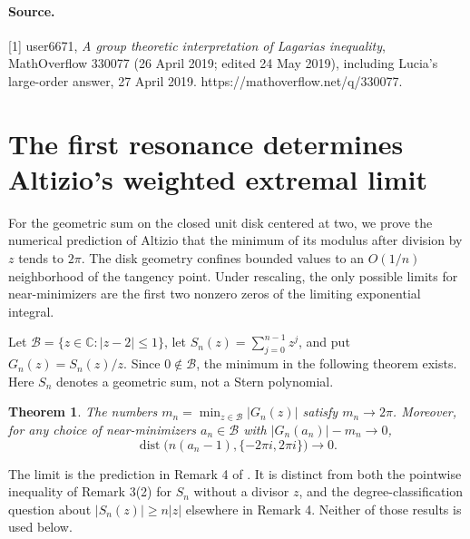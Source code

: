 \documentclass[11pt,a4paper]{article}
\numberwithin{equation}{section}
\newtheorem{theorem}{Theorem}[section]
\theoremstyle{definition}
\theoremstyle{remark}
\newenvironment{sectionabstract}{\par\smallskip\begingroup\small\noindent}{\par\endgroup\medskip}
\begin{document}
\paragraph{Source.} [1] user6671, \emph{A group theoretic interpretation of Lagarias inequality}, MathOverflow 330077 (26 April 2019; edited 24 May 2019), including Lucia's large-order answer, 27 April 2019. https://mathoverflow.net/q/330077.

\par\endgroup

\begingroup
\newcommand{\B}{\mathcal B}
\section{\texorpdfstring{The first resonance determines Altizio's weighted extremal limit}{The first resonance determines Altizio's weighted extremal limit}}\label{section:r50reiwa}
\par\medskip


\begin{sectionabstract}
For the geometric sum on the closed unit disk centered at two, we prove the numerical prediction of Altizio that the minimum of its modulus after division by \(z\) tends to \(2\pi\). The disk geometry confines bounded values to an \(O(1/n)\) neighborhood of the tangency point. Under rescaling, the only possible limits for near-minimizers are the first two nonzero zeros of the limiting exponential integral.
\end{sectionabstract}

Let \(\B=\{z\in\mathbb C:|z-2|\le1\}\), let \(S_n(z)=\sum_{j=0}^{n-1}z^j\), and put \(G_n(z)=S_n(z)/z\). Since \(0\notin\B\), the minimum in the following theorem exists. Here \(S_n\) denotes a geometric sum, not a Stern polynomial.
\begin{theorem}\label{r50reiwa:main}
The numbers \(m_n=\min_{z\in\B}|G_n(z)|\) satisfy \(m_n\to2\pi\). Moreover, for any choice of near-minimizers \(a_n\in\B\) with \(|G_n(a_n)|-m_n\to0\),
\[
 \operatorname{dist}\bigl(n(a_n-1),\{-2\pi i,2\pi i\}\bigr)\longrightarrow0.
\]
\end{theorem}
The limit is the prediction in Remark 4 of \cite{r50reiwa:A}. It is distinct from both the pointwise inequality of Remark 3(2) for \(S_n\) without a divisor \(z\), and the degree-classification question about \(|S_n(z)|\ge n|z|\) elsewhere in Remark 4. Neither of those results is used below.
\end{document}
